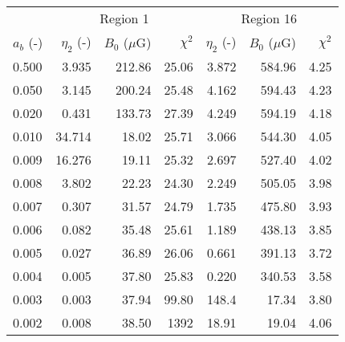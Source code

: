 \begin{tabular}{@{}lrrrrrr@{}}
\toprule
{} & \multicolumn{3}{c}{Region 1} & \multicolumn{3}{c}{Region 16}\\
\cmidrule(lr){2-4} \cmidrule(l){5-7}
$a_b$ (-) & $\eta_2$ (-) & $B_0$ ($\mu$G) & $\chi^2$
          & $\eta_2$ (-) & $B_0$ ($\mu$G) & $\chi^2$ \\
\midrule
0.500 &  3.935 & 212.86 & 25.06 & 3.872 & 584.96 & 4.25 \\
0.050 &  3.145 & 200.24 & 25.48 & 4.162 & 594.43 & 4.23 \\
0.020 &  0.431 & 133.73 & 27.39 & 4.249 & 594.19 & 4.18 \\
0.010 & 34.714 &  18.02 & 25.71 & 3.066 & 544.30 & 4.05 \\
0.009 & 16.276 &  19.11 & 25.32 & 2.697 & 527.40 & 4.02 \\
0.008 &  3.802 &  22.23 & 24.30 & 2.249 & 505.05 & 3.98 \\
0.007 &  0.307 &  31.57 & 24.79 & 1.735 & 475.80 & 3.93 \\
0.006 &  0.082 &  35.48 & 25.61 & 1.189 & 438.13 & 3.85 \\
0.005 &  0.027 &  36.89 & 26.06 & 0.661 & 391.13 & 3.72 \\
0.004 &  0.005 &  37.80 & 25.83 & 0.220 & 340.53 & 3.58 \\
0.003 &  0.003 &  37.94 & 99.80 & 148.4 &  17.34 & 3.80 \\
0.002 &  0.008 &  38.50 &  1392 & 18.91 &  19.04 & 4.06 \\
\bottomrule
\end{tabular}





